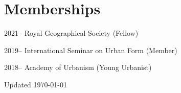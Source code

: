 \documentclass[12pt,a4paper]{report}
\begin{document}
    \section*{Memberships}

    \begin{tablist}

        \item[2021--] \tab{}Royal Geographical Society (Fellow)
        \item[2019--] \tab{}International Seminar on Urban Form (Member)
        \item[2018--] \tab{}Academy of Urbanism (Young Urbanist)

    \end{tablist}

    \begin{center}
        \vfill
        Updated \monthyeardate\today
    \end{center}
\end{document}
